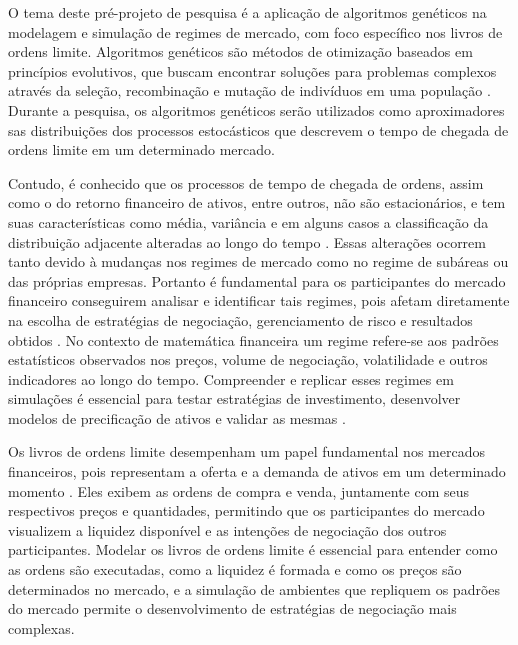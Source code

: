 O tema deste pré-projeto de pesquisa é a aplicação de algoritmos genéticos na modelagem e simulação de regimes de mercado, com foco específico nos livros de ordens limite. Algoritmos genéticos são métodos de otimização baseados em princípios evolutivos, que buscam encontrar soluções para problemas complexos através da seleção, recombinação e mutação de indivíduos em uma população \cite{goldberg1989genetic, holland1975adaptation}. Durante a pesquisa, os algoritmos genéticos serão utilizados como aproximadores sas distribuições dos processos estocásticos que descrevem o tempo de chegada de ordens limite em um determinado mercado.

Contudo, é conhecido que os processos de tempo de chegada de ordens, assim como o do retorno financeiro de ativos, entre outros, não são estacionários, e tem suas características como média, variância e em alguns casos a classificação da distribuição adjacente alteradas ao longo do tempo \cite{cont2001empirical}. Essas alterações ocorrem tanto devido à mudanças nos regimes de mercado como no regime de subáreas ou das próprias empresas. Portanto é fundamental para os participantes do mercado financeiro conseguirem analisar e identificar tais regimes, pois afetam diretamente na escolha de estratégias de negociação, gerenciamento de risco e resultados obtidos \cite{gatheral2010no}. No contexto de matemática financeira um regime refere-se aos padrões estatísticos observados nos preços, volume de negociação, volatilidade e outros indicadores ao longo do tempo. Compreender e replicar esses regimes em simulações é essencial para testar estratégias de investimento, desenvolver modelos de precificação de ativos e validar as mesmas \cite{back1997handbook, mitchell1996introduction}.

Os livros de ordens limite desempenham um papel fundamental nos mercados financeiros, pois representam a oferta e a demanda de ativos em um determinado momento \cite{hasbrouck2007empirical}. Eles exibem as ordens de compra e venda, juntamente com seus respectivos preços e quantidades, permitindo que os participantes do mercado visualizem a liquidez disponível e as intenções de negociação dos outros participantes. Modelar os livros de ordens limite é essencial para entender como as ordens são executadas, como a liquidez é formada e como os preços são determinados no mercado, e a simulação de ambientes que repliquem os padrões do mercado permite o desenvolvimento de estratégias de negociação mais complexas.

